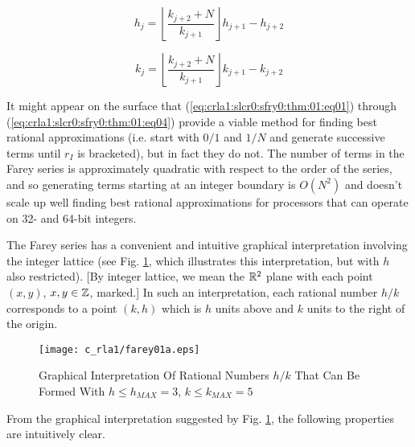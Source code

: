 \begin{equation}
\label{eq:crla1:slcr0:sfry0:thm:01:eq03}
h_j  = \left\lfloor {\frac{{k_{j + 2}  + N}}{{k_{j + 1} }}} 
\right\rfloor h_{j + 1}  - h_{j + 2}
\end{equation}

\begin{equation}
\label{eq:crla1:slcr0:sfry0:thm:01:eq04}
k_j  = \left\lfloor {\frac{{k_{j + 2}  + N}}{{k_{j + 1} }}} 
\right\rfloor k_{j + 1}  - k_{j + 2}
\end{equation}

It might appear on the surface that (\ref{eq:crla1:slcr0:sfry0:thm:01:eq01})
through (\ref{eq:crla1:slcr0:sfry0:thm:01:eq04}) provide a viable 
method for finding best rational approximations (i.e.
start with $0/1$ and $1/N$ and generate successive terms until
$r_I$ is bracketed), but in fact they do not.
The number of terms in the Farey series is approximately quadratic with
respect to the order of the series, and so generating terms starting at
an integer boundary is $O(N^2)$ and doesn't scale up well 
finding best rational approximations for processors that can
operate on 32- and 64-bit integers.

The Farey series has a convenient and intuitive graphical interpretation
involving the integer lattice%
(see Fig. \ref{fig:crla1:slcr0:sfry0:00},
which illustrates this interpretation, but with $h$
also restricted).
[By integer lattice, we mean the ${\mathbb{R}}{}^2$ plane
with each point $(x,y)$, $x,y \in {\mathbb{Z}}$, marked.]
In such an interpretation, each rational number $h/k$ corresponds to
a point $(k,h)$ which is $h$ units above and $k$ units 
to the right of the origin.

\begin{figure}
\centering
\texttt{[image: c\_rla1/farey01a.eps]}
\caption{Graphical Interpretation Of Rational Numbers 
         $h/k$ That Can Be Formed With $h \leq h_{MAX}=3$, $k \leq k_{MAX}=5$}
\label{fig:crla1:slcr0:sfry0:00}
\end{figure}

From the graphical interpretation suggested by Fig. \ref{fig:crla1:slcr0:sfry0:00},
the following properties are intuitively clear.

